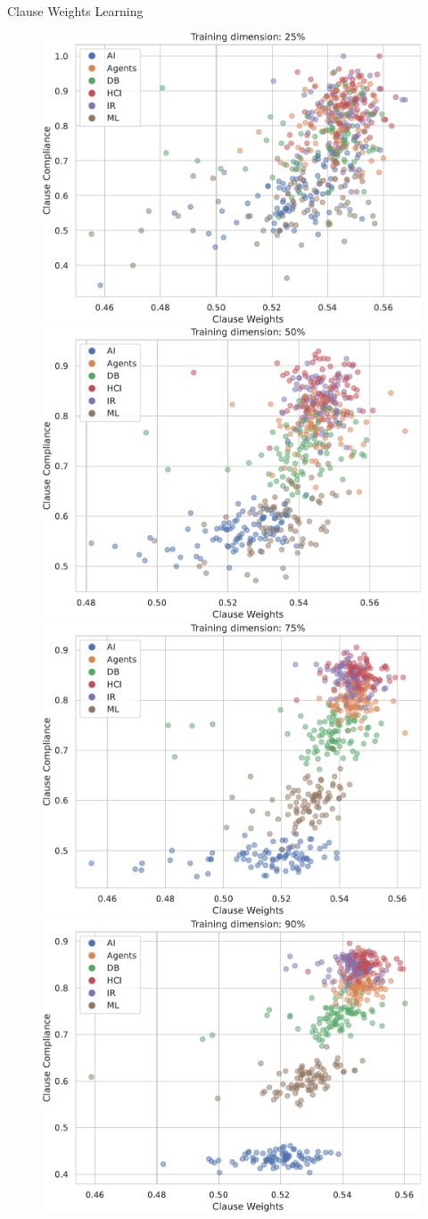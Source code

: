 \documentclass{beamer}
\begin{document}
\begin{frame}{Clause Weights Learning}
	\begin{figure}
		\includegraphics[width=0.41\linewidth]{images/scatter_25.pdf}%
		\hspace{5pt}
		\includegraphics[width=0.41\linewidth]{images/scatter_50.pdf}
		\includegraphics[width=0.41\linewidth]{images/scatter_75.pdf}%
		\hspace{5pt}
		\includegraphics[width=0.41\linewidth]{images/scatter_90.pdf}
	\end{figure}
\end{frame}


\end{document}
